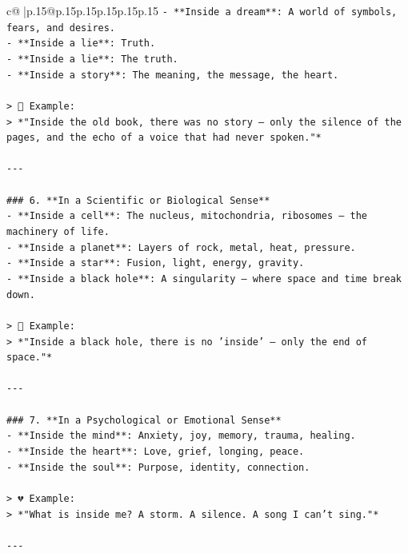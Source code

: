 \documentclass{article}
\begin{document}
{\begin{supertabular}{c@{$\;$}|p{.15\linewidth}@{}p{.15\linewidth}p{.15\linewidth}p{.15\linewidth}p{.15\linewidth}p{.15\linewidth}}
{{{\texttt{{-} **Inside a dream**: A world of symbols, fears, and desires.  } \\
\texttt{{-} **Inside a lie**: Truth.  } \\
\texttt{{-} **Inside a lie**: The truth.  } \\
\texttt{{-} **Inside a story**: The meaning, the message, the heart.} \\
\\ 
\texttt{> 📖 Example:  } \\
\texttt{> *"Inside the old book, there was no story — only the silence of the pages, and the echo of a voice that had never spoken."*} \\
\\ 
\texttt{{-}{-}{-}} \\
\\ 
\texttt{\#\#\# 6. **In a Scientific or Biological Sense**  } \\
\texttt{{-} **Inside a cell**: The nucleus, mitochondria, ribosomes — the machinery of life.  } \\
\texttt{{-} **Inside a planet**: Layers of rock, metal, heat, pressure.  } \\
\texttt{{-} **Inside a star**: Fusion, light, energy, gravity.  } \\
\texttt{{-} **Inside a black hole**: A singularity — where space and time break down.} \\
\\ 
\texttt{> 🌌 Example:  } \\
\texttt{> *"Inside a black hole, there is no 'inside' — only the end of space."*} \\
\\ 
\texttt{{-}{-}{-}} \\
\\ 
\texttt{\#\#\# 7. **In a Psychological or Emotional Sense**  } \\
\texttt{{-} **Inside the mind**: Anxiety, joy, memory, trauma, healing.  } \\
\texttt{{-} **Inside the heart**: Love, grief, longing, peace.  } \\
\texttt{{-} **Inside the soul**: Purpose, identity, connection.} \\
\\ 
\texttt{> 💔 Example:  } \\
\texttt{> *"What is inside me? A storm. A silence. A song I can’t sing."*} \\
\\ 
\texttt{{-}{-}{-}} \\
}}}
\end{supertabular}}
\end{document}
